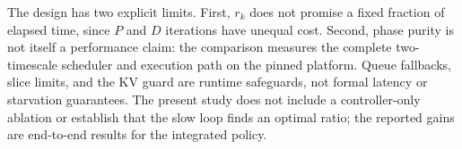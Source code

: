 The design has two explicit limits. First, $r_k$ does not promise a fixed
fraction of elapsed time, since $P$ and $D$ iterations have unequal cost.
Second, phase purity is not itself a performance claim: the comparison measures
the complete two-timescale scheduler and execution path on the pinned platform.
Queue fallbacks, slice limits, and the KV guard are runtime safeguards, not
formal latency or starvation guarantees. The present study does not include a
controller-only ablation or establish that the slow loop finds an optimal
ratio; the reported gains are end-to-end results for the integrated policy.
